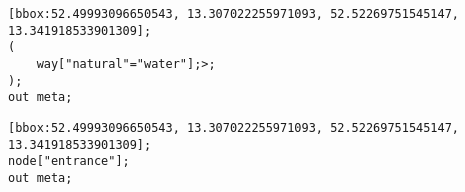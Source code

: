 \begin{lstlisting}[caption={Overpass Turbo query for water areas next to the campus}, label={water}]
[bbox:52.49993096650543, 13.307022255971093, 52.52269751545147, 13.341918533901309];
(
    way["natural"="water"];>;
);
out meta;
\end{lstlisting}

\begin{lstlisting}[caption={Overpass Turbo query for all entrances to buildings on the campus}, label={entrances}]
[bbox:52.49993096650543, 13.307022255971093, 52.52269751545147, 13.341918533901309];
node["entrance"];
out meta;
\end{lstlisting}